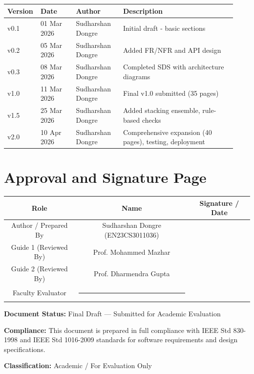 \documentclass[12pt,a4paper]{report}
\begin{document}
\begin{longtable}{p{0.10\linewidth}p{0.15\linewidth}p{0.20\linewidth}p{0.48\linewidth}}
\toprule
\textbf{Version} & \textbf{Date} & \textbf{Author} & \textbf{Description} \\
\midrule
v0.1 & 01 Mar 2026 & Sudharshan Dongre & Initial draft - basic sections \\
v0.2 & 05 Mar 2026 & Sudharshan Dongre & Added FR/NFR and API design \\
v0.3 & 08 Mar 2026 & Sudharshan Dongre & Completed SDS with architecture diagrams \\
v1.0 & 11 Mar 2026 & Sudharshan Dongre & Final v1.0 submitted (35 pages) \\
v1.5 & 25 Mar 2026 & Sudharshan Dongre & Added stacking ensemble, rule-based checks \\
v2.0 & 10 Apr 2026 & Sudharshan Dongre & Comprehensive expansion (40 pages), testing, deployment \\
\bottomrule
\end{longtable}

\chapter{Approval and Signature Page}

\begin{table}[h]
\centering
\begin{tabular}{|c|c|c|}
\hline
\textbf{Role} & \textbf{Name} & \textbf{Signature / Date} \\
\hline
Author / Prepared By & Sudharshan Dongre (EN23CS3011036) & \underline{\hspace{4cm}} \\
\hline
Guide 1 (Reviewed By) & Prof. Mohammed Mazhar & \underline{\hspace{4cm}} \\
\hline
Guide 2 (Reviewed By) & Prof. Dharmendra Gupta & \underline{\hspace{4cm}} \\
\hline
Faculty Evaluator & \rule{4cm}{0pt} & \underline{\hspace{4cm}} \\
\hline
\end{tabular}
\end{table}

\vspace*{0.5cm}

\noindent
\textbf{Document Status:} Final Draft --- Submitted for Academic Evaluation

\noindent
\textbf{Compliance:} This document is prepared in full compliance with IEEE Std 830-1998 
and IEEE Std 1016-2009 standards for software requirements and design specifications.

\noindent
\textbf{Classification:} Academic / For Evaluation Only
\end{document}
